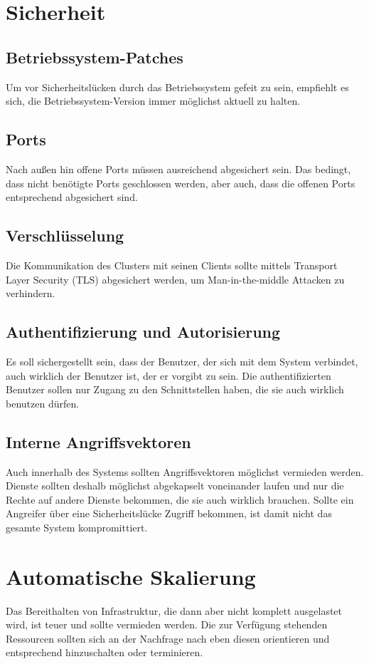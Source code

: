 \section{Sicherheit}

\subsection{Betriebssystem-Patches}
Um vor Sicherheitslücken durch das Betriebssystem gefeit zu sein,
empfiehlt es sich, die Betriebssystem-Version immer möglichst aktuell zu halten.

\subsection{Ports}
Nach außen hin offene Ports müssen ausreichend abgesichert sein. Das bedingt,
dass nicht benötigte Ports geschlossen werden, aber auch, dass die offenen Ports
entsprechend abgesichert sind.

\subsection{Verschlüsselung}
Die Kommunikation des Clusters mit seinen Clients sollte mittels Transport
Layer Security (TLS) abgesichert werden, um Man-in-the-middle Attacken
zu verhindern.

\subsection{Authentifizierung und Autorisierung}
Es soll sichergestellt sein, dass der Benutzer, der sich mit dem System verbindet,
auch wirklich der Benutzer ist, der er vorgibt zu sein.
Die authentifizierten Benutzer sollen nur Zugang zu den Schnittstellen haben,
die sie auch wirklich benutzen dürfen.

\subsection{Interne Angriffsvektoren}
Auch innerhalb des Systems sollten Angriffsvektoren möglichst vermieden werden.
Dienste sollten deshalb möglichst abgekapselt voneinander laufen und nur die
Rechte auf
andere Dienste bekommen, die sie auch wirklich brauchen.
Sollte ein Angreifer über eine Sicherheitslücke Zugriff bekommen, ist damit
nicht das gesamte System kompromittiert.

\section{Automatische Skalierung}
Das Bereithalten von Infrastruktur, die dann aber nicht komplett ausgelastet wird,
ist teuer und sollte vermieden werden.
Die zur Verfügung stehenden Ressourcen sollten sich an der Nachfrage nach eben
diesen orientieren
und entsprechend hinzuschalten oder terminieren.


